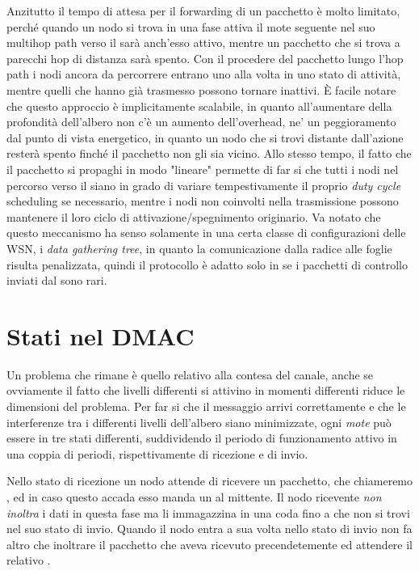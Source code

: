 \documentclass[twoside,11pt,a4paper,italian,openany]{book}
\begin{document}
 Anzitutto il tempo di attesa per il forwarding di un
pacchetto è molto limitato, perché quando un nodo si trova in una fase attiva il mote seguente
nel suo multihop path verso il \sink sarà anch'esso attivo, mentre un pacchetto che si trova 
a parecchi hop di distanza sarà spento. 
Con il procedere del pacchetto lungo l'hop path i nodi ancora da percorrere entrano uno alla 
volta in uno stato di attività, mentre quelli che hanno già trasmesso possono tornare inattivi.
\`E facile notare che questo approccio è implicitamente scalabile, in quanto all'aumentare della profondità dell'albero non c'è un aumento dell'overhead, ne' un peggioramento dal punto di vista energetico, in quanto un nodo che si trovi distante dall'azione resterà spento finché il 
pacchetto non gli sia vicino.
Allo stesso tempo, il fatto che il pacchetto si propaghi in modo "lineare" permette di far si 
che tutti i nodi nel percorso verso il \sink siano in grado di variare tempestivamente il 
proprio \emph{duty cycle} scheduling se necessario, mentre i nodi non coinvolti nella trasmissione possono mantenere il loro ciclo di attivazione/spegnimento originario. 
Va notato che questo meccanismo ha senso solamente in una certa classe di configurazioni 
delle WSN, i \emph{data gathering tree}, in quanto la comunicazione dalla radice alle foglie 
risulta penalizzata, quindi il protocollo è adatto solo in se i pacchetti di controllo 
inviati dal \sink sono rari. 

\section{Stati nel DMAC}
Un problema che rimane è quello relativo alla contesa del canale, anche se ovviamente il fatto 
che livelli differenti si attivino in momenti differenti riduce le dimensioni del problema.
Per far si che il messaggio arrivi correttamente e che le interferenze tra i differenti livelli 
dell'albero siano minimizzate, ogni \emph{mote} può essere in tre stati differenti, 
suddividendo il  periodo di funzionamento attivo in una coppia di periodi,
rispettivamente di ricezione e di invio.

Nello stato di ricezione un nodo attende di ricevere un pacchetto, che chiameremo \req,
ed in caso questo accada esso manda un \ack al mittente. 
Il nodo ricevente \emph{non inoltra} i dati in questa 
fase ma li immagazzina in una coda fino a che non si trovi nel suo stato di invio. 
Quando il nodo entra a sua volta nello stato di invio non fa altro che inoltrare il pacchetto 
che aveva ricevuto precendetemente ed attendere il relativo \ack.  
\end{document}
